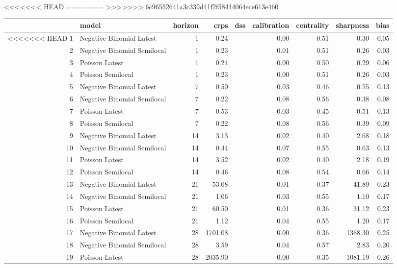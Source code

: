 <<<<<<< HEAD
=======
>>>>>>> 6c96552641a3c339d41f2f58414064ece613e460
\begin{table}[ht]
\centering
\begin{tabular}{rlrrrrrrr}
  \hline
 & model & horizon & crps & dss & calibration & centrality & sharpness & bias \\ 
  \hline
<<<<<<< HEAD
1 & Negative Binomial Latest &   1 & 0.24 &  & 0.00 & 0.51 & 0.30 & 0.05 \\ 
  2 & Negative Binomial Semilocal &   1 & 0.23 &  & 0.01 & 0.51 & 0.26 & 0.03 \\ 
  3 & Poisson Latest &   1 & 0.24 &  & 0.00 & 0.50 & 0.29 & 0.06 \\ 
  4 & Poisson Semilocal &   1 & 0.23 &  & 0.00 & 0.51 & 0.26 & 0.03 \\ 
  5 & Negative Binomial Latest &   7 & 0.50 &  & 0.03 & 0.46 & 0.55 & 0.13 \\ 
  6 & Negative Binomial Semilocal &   7 & 0.22 &  & 0.08 & 0.56 & 0.38 & 0.08 \\ 
  7 & Poisson Latest &   7 & 0.53 &  & 0.03 & 0.45 & 0.51 & 0.13 \\ 
  8 & Poisson Semilocal &   7 & 0.22 &  & 0.08 & 0.56 & 0.39 & 0.09 \\ 
  9 & Negative Binomial Latest &  14 & 3.13 &  & 0.02 & 0.40 & 2.68 & 0.18 \\ 
  10 & Negative Binomial Semilocal &  14 & 0.44 &  & 0.07 & 0.55 & 0.63 & 0.13 \\ 
  11 & Poisson Latest &  14 & 3.52 &  & 0.02 & 0.40 & 2.18 & 0.19 \\ 
  12 & Poisson Semilocal &  14 & 0.46 &  & 0.08 & 0.54 & 0.66 & 0.14 \\ 
  13 & Negative Binomial Latest &  21 & 53.08 &  & 0.01 & 0.37 & 41.89 & 0.23 \\ 
  14 & Negative Binomial Semilocal &  21 & 1.06 &  & 0.03 & 0.55 & 1.10 & 0.17 \\ 
  15 & Poisson Latest &  21 & 60.50 &  & 0.01 & 0.36 & 31.12 & 0.23 \\ 
  16 & Poisson Semilocal &  21 & 1.12 &  & 0.04 & 0.55 & 1.20 & 0.17 \\ 
  17 & Negative Binomial Latest &  28 & 1701.08 &  & 0.00 & 0.36 & 1368.30 & 0.25 \\ 
  18 & Negative Binomial Semilocal &  28 & 3.59 &  & 0.04 & 0.57 & 2.83 & 0.20 \\ 
  19 & Poisson Latest &  28 & 2035.90 &  & 0.00 & 0.35 & 1081.19 & 0.26 \\ 

\end{tabular}
\end{table}
